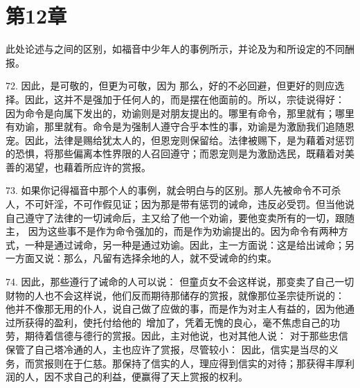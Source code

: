 
\section{第12章}

此处论述与之间的区别，如福音中少年人的事例所示，并论及为和所设定的不同酬报。\par

72. 因此，是可敬的，但更为可敬，因为 那么，好的不必回避，但更好的则应选择。因此，这并不是强加于任何人的，而是摆在他面前的。所以，宗徒说得好： 因为命令是向属下发出的，劝谕则是对朋友提出的。哪里有命令，那里就有；哪里有劝谕，那里就有。命令是为强制人遵守合乎本性的事，劝谕是为激励我们追随恩宠。因此，法律是赐给犹太人的，但恩宠则保留给。法律被赐下，是为藉着对惩罚的恐惧，将那些偏离本性界限的人召回遵守；而恩宠则是为激励选民，既藉着对美善的渴望，也藉着所应许的赏报。\par

73. 如果你记得福音中那个人的事例，就会明白与的区别。那人先被命令不可杀人，不可奸淫，不可作假见证；因为那是带有惩罚的诫命，违反必受罚。但当他说自己遵守了法律的一切诫命后，主又给了他一个劝谕，要他变卖所有的一切，跟随主， 因为这些事不是作为命令强加的，而是作为劝谕提出的。因为命令有两种方式，一种是通过诫命，另一种是通过劝谕。因此，主一方面说：这是给出诫命；另一方面又说：那么，凡留有选择余地的人，就不受诫命的约束。\par

74. 因此，那些遵行了诫命的人可以说： 但童贞女不会这样说，那变卖了自己一切财物的人也不会这样说，他们反而期待那储存的赏报，就像那位圣宗徒所说的： 他并不像那无用的仆人，说自己做了应做的事，而是作为对主人有益的，因为他通过所获得的盈利，使托付给他的~增加了，凭着无愧的良心，毫不焦虑自己的功劳，期待着信德与德行的赏报。因此，主对他说，也对其他人说： 对于那些忠信保管了自己塔冷通的人，主也应许了赏报，尽管较小： 因此，信实是当尽的义务，而赏报则在于仁慈。那保持了信实的人，理应得到信实的对待；那获得丰厚利润的人，因不求自己的利益，便赢得了天上赏报的权利。\par

